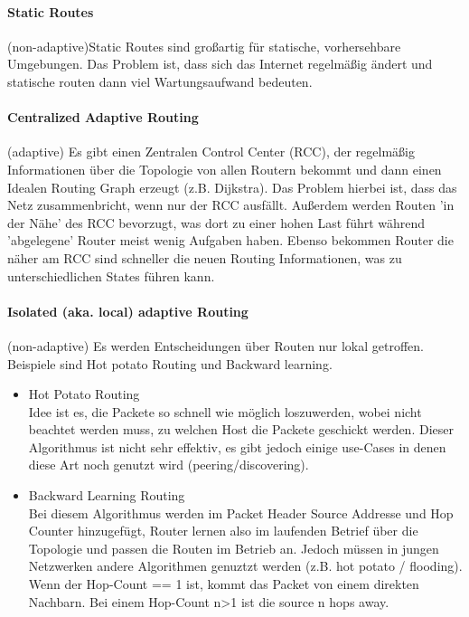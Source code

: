             \paragraph{Static Routes}
                (non-adaptive)Static Routes sind großartig für statische, vorhersehbare Umgebungen. Das Problem ist, dass sich das Internet regelmäßig ändert und statische routen dann viel Wartungsaufwand bedeuten. 
            
            \paragraph{Centralized Adaptive Routing}
                (adaptive) Es gibt einen Zentralen Control Center (RCC), der regelmäßig Informationen über die Topologie von allen Routern bekommt und dann einen Idealen Routing Graph erzeugt (z.B. Dijkstra). Das Problem hierbei ist, dass das Netz zusammenbricht, wenn nur der RCC ausfällt. Außerdem werden Routen 'in der Nähe' des RCC bevorzugt, was dort zu einer hohen Last führt während 'abgelegene' Router meist wenig Aufgaben haben. Ebenso bekommen Router die näher am RCC sind schneller die neuen Routing Informationen, was zu unterschiedlichen States führen kann.
                
            \paragraph{Isolated (aka. local) adaptive Routing}
                (non-adaptive) Es werden Entscheidungen über Routen nur lokal getroffen. Beispiele sind Hot potato Routing und Backward learning. 
                \begin{itemize}
                    \item Hot Potato Routing \\
                        Idee ist es, die Packete so schnell wie möglich loszuwerden, wobei nicht beachtet werden muss, zu welchen Host die Packete geschickt werden. Dieser Algorithmus ist nicht sehr effektiv, es gibt jedoch einige use-Cases in denen diese Art noch genutzt wird (peering/discovering).
                    \item Backward Learning Routing \\
                        Bei diesem Algorithmus werden im Packet Header Source Addresse und Hop Counter hinzugefügt, Router lernen also im laufenden Betrief über die Topologie und passen die Routen im Betrieb an. Jedoch müssen in jungen Netzwerken andere Algorithmen genuztzt werden (z.B. hot potato / flooding). Wenn der Hop-Count == 1 ist, kommt das Packet von einem direkten Nachbarn. Bei einem Hop-Count n>1 ist die source n hops away. 
                \end{itemize}
            
